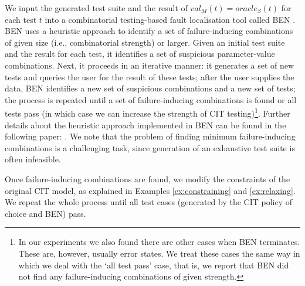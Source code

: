\begin{tikzborder}{\cite{Gargantini16:validation}}
\begin{tikzborder}{\cite{gargantini_combinatorial_2017}}
We input the generated test suite and the result of $val_{M}(t)=\mathit{oracle}_{S}(t)$ for each test $t$ into a combinatorial testing-based fault localisation tool called BEN \cite{ben_2015}. BEN uses a heuristic approach to identify a set of failure-inducing combinations of given size (i.e., combinatorial strength) or larger. Given an initial test suite and the result for each test, it identifies a set of suspicious parameter-value combinations. Next, it proceeds in an iterative manner: it generates a set of new tests and queries the user for the result of these tests; after the user supplies the data, BEN identifies a new set of suspicious combinations and a new set of tests; the process is repeated until a set of failure-inducing combinations is found or all tests pass (in which case we can increase the strength of CIT testing)\footnote{In our experiments we also found there are other cases when BEN terminates. These are, however, usually error states. We treat these cases the same way in which we deal with the `all test pass' case, that is, we report that BEN did not find any failure-inducing combinations of given strength.}.
Further details about the heuristic approach implemented in BEN can be found in the following paper: \cite{ben_2015}.
We note that the problem of finding minimum failure-inducing combinations is a challenging task, since generation of an exhaustive test suite is often infeasible. 

Once failure-inducing combinations are found, we modify the constraints of the original CIT model, as explained in Examples \ref{ex:constraining} and \ref{ex:relaxing}. We repeat the whole process until all test cases (generated by the CIT policy of choice and BEN) pass. 


\end{tikzborder}
\end{tikzborder}
